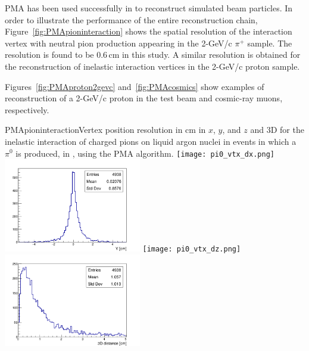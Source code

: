 PMA has been used successfully in \pdsp to reconstruct simulated beam particles. In order to illustrate the performance of the entire reconstruction chain,
Figure~\ref{fig:PMApioninteraction} shows the spatial resolution of the interaction vertex with neutral pion
production appearing in the 2-GeV/c $\pi^+$ sample.
The resolution is found to be 0.6\,cm in this study.
A similar resolution is obtained for the reconstruction
of inelastic interaction vertices in the 2-GeV/c proton sample. 


Figures~\ref{fig:PMAproton2gevc}
and~\ref{fig:PMAcosmics} show examples of reconstruction of a 2-GeV/c proton in the test beam and
cosmic-ray muons, respectively.

\begin{cdrfigure}{PMApioninteraction}{Vertex position resolution in cm in $x$, $y$, and $z$ and 3D for the
  inelastic interaction of charged pions on liquid argon nuclei in events in which a $\pi^0$ is produced, in
  \pdsp, using the PMA algorithm.}
\texttt{[image: pi0\_vtx\_dx.png]}\includegraphics[width=0.45\textwidth]{figures/pi0_vtx_dy.png}
\texttt{[image: pi0\_vtx\_dz.png]}\includegraphics[width=0.45\textwidth]{figures/pi0_vtx3d.png}
\end{cdrfigure}


